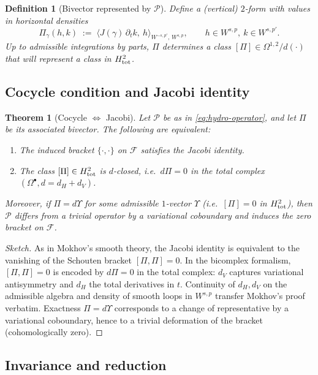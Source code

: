 \documentclass{amsart}
\newcounter{thm}
\newcounter{ex}
\newcounter{re}
\newtheorem{theorem}[thm]{Theorem}
\newtheorem{definition}[thm]{Definition}
\begin{document}
\begin{definition}[Bivector represented by $\mathcal P$]
Define a (vertical) $2$-form with values in horizontal densities
\[
\Pi_\gamma(h,k)\;:=\;\big\langle J(\gamma)\,\partial_t k,\ h\big\rangle_{W^{-s,p'},\,W^{s,p}},
\qquad h\in W^{s,p},\ k\in W^{s,p'}.
\]
Up to admissible integrations by parts, $\Pi$ determines a class
$[\Pi]\in \Omega^{1,2}/d(\cdot)$ that will represent a class in $H^2_{\rm tot}$.
\end{definition}

\subsection{Cocycle condition and Jacobi identity}

\begin{theorem}[Cocycle $\Leftrightarrow$ Jacobi]\label{th:cocycle-jacobi}
Let $\mathcal P$ be as in \eqref{eq:hydro-operator}, and let $\Pi$ be
its associated bivector. The following are equivalent:
\begin{enumerate}
\item The induced bracket $\{\cdot,\cdot\}$ on $\mathcal F$ satisfies the Jacobi identity.
\item The class $[\Pi]\in H^2_{\rm tot}$ is $d$-closed, i.e.\ $d\Pi=0$
in the total complex $(\Omega^\bullet,d=d_H+d_V)$.
\end{enumerate}
Moreover, if $\Pi=d\Upsilon$ for some admissible $1$-vector $\Upsilon$
(i.e.\ $[\Pi]=0$ in $H^2_{\rm tot}$), then $\mathcal P$ differs from
a trivial operator by a variational coboundary and induces the zero bracket on $\mathcal F$.
\end{theorem}

\begin{proof}[Sketch]
As in Mokhov's smooth theory, the Jacobi identity is equivalent to the vanishing of
the Schouten bracket $[\Pi,\Pi]=0$. In the bicomplex formalism,
$[\Pi,\Pi]=0$ is encoded by $d\Pi=0$ in the total complex:
$d_V$ captures variational antisymmetry and $d_H$ the total derivatives in $t$.
Continuity of $d_H,d_V$ on the admissible algebra and density
of smooth loops in $W^{s,p}$ transfer Mokhov's proof verbatim.
Exactness $\Pi=d\Upsilon$ corresponds to a change of representative by a variational
coboundary, hence to a trivial deformation of the bracket (cohomologically zero).
\end{proof}



\subsection{Invariance and reduction}
\end{document}
